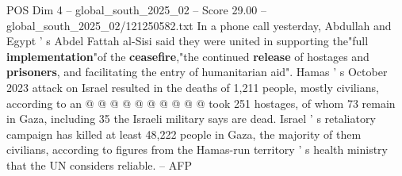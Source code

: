 \begin{textsample}{POS Dim 4 – global\_south\_2025\_02 – Score 29.00 – global\_south\_2025\_02/121250582.txt}
In a phone call yesterday, Abdullah and Egypt ' s Abdel Fattah al-Sisi said they were united in supporting the"full \textbf{implementation}"of the \textbf{ceasefire},"the continued \textbf{release} of hostages and \textbf{prisoners}, and facilitating the entry of humanitarian aid".
Hamas ' s October 2023 attack on Israel resulted in the deaths of 1,211 people, mostly civilians, according to an @ @ @ @ @ @ @ @ @ @ took 251 hostages, of whom 73 remain in Gaza, including 35 the Israeli military says are dead.
Israel ' s retaliatory campaign has killed at least 48,222 people in Gaza, the majority of them civilians, according to figures from the Hamas-run territory ' s health ministry that the UN considers reliable. -- AFP

\end{textsample}
